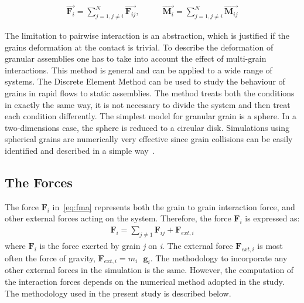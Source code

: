 \begin{align}
   \overrightarrow{{\mathbf{F}}_i}=\sum\limits_{j=1,j\ne 
   i}^{N}{\overrightarrow{\mathbf{F}_{ij}}}, \qquad 
   &\overrightarrow{\mathbf{M}_{i}}=\sum\limits_{j=1,j\ne 
   i}^{N}{\overrightarrow{\mathbf{M}_{ij}}}
\end{align}

The limitation to pairwise interaction is an abstraction, which is justified 
if 
the grains 
deformation at the contact is trivial. To describe the deformation of granular 
assemblies one has 
to take into account the effect of multi-grain interactions. This method is 
general and can be 
applied to a wide range of systems. The Discrete Element Method can be used to 
study the 
behaviour of grains in rapid flows to static assemblies. The method treats 
both 
the conditions in 
exactly the same way, it is not necessary to divide the system and then treat 
each condition 
differently. The simplest model for granular grain is a sphere. In a 
two-dimensions case, the 
sphere is reduced to a circular disk. Simulations using spherical grains 
are 
numerically very 
effective since grain collisions can be easily identified and described in 
a 
simple 
way~\citep{Posch2005}.

% 

\subsection{The Forces}

The force $\mathbf{F}_{\mathit{i}}$ in~\cref{eq:fma} represents both the grain 
to grain 
interaction force, and other external forces acting on the system. Therefore, 
the force 
$\mathbf{F}_{\mathit{i}}$ is expressed as:
\begin{align} \label{eq:f}
 \mathbf{{F}}_{i}=\sum\limits_{j\ne 1}{\mathbf{{F}}_{ij}+\mathbf{{F}}_{ext, i}}
\end{align}
where $\mathbf{F}_{\mathit{i}}$ is the force exerted by grain \textit{j} on 
\textit{i}. The 
external force $\mathbf{F}_{\mathit{ext,i}}$ is most often the force of 
gravity, 
$\mathbf{F}_{\mathit{ext,i}} = m_{\mathit{i}} \mbox{ }\mathbf{g}_{\mathit{i}}$. 
The methodology to 
incorporate any other external forces in the simulation is the same. However, 
the computation of 
the interaction forces depends on the numerical method adopted in the study. 
The methodology used 
in the present study is described below. 

